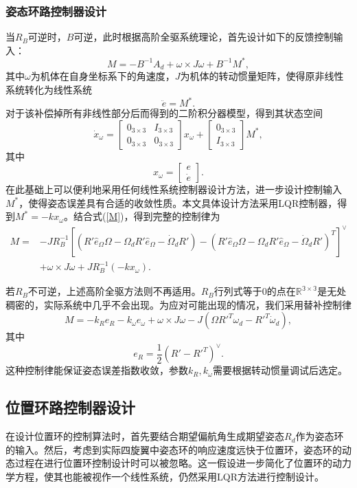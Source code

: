 \subsubsection*{姿态环路控制器设计}
当$R_B$可逆时，$B$可逆，此时根据高阶全驱系统理论\cite{duan1}，首先设计如下的反馈控制输入：\begin{equation}
  M=-B^{-1} A_d+\omega \times J\omega +B^{-1}M^*,
  \label{M}
\end{equation}
其中$\omega$为机体在自身坐标系下的角速度，$J$为机体的转动惯量矩阵，使得原非线性系统转化为线性系统
    $$\ddot e=M^*.$$
对于该补偿掉所有非线性部分后而得到的二阶积分器模型，得到其状态空间
    $$\dot x_\omega=\begin{bmatrix}
        0_{3\times 3} & I_{3\times 3} \\
        0_{3\times 3} & 0_{3\times 3}
    \end{bmatrix} x_\omega+\begin{bmatrix}
        0_{3\times 3} \\ I_{3\times 3}
    \end{bmatrix} M^* ,$$
   其中$$x_\omega=\begin{bmatrix}
        e \\ \dot e
    \end{bmatrix}.$$
在此基础上可以便利地采用任何线性系统控制器设计方法，进一步设计控制输入$M^*$，使得姿态误差具有合适的收敛性质。本文具体设计方法采用LQR控制器，得到$M^*=-kx_\omega$。结合式(\ref{M})，得到完整的控制律为
   $$ \begin{aligned}
        M=&-J R_B^{-1} [(R' \hat e_\Omega \Omega  -\Omega_d R' \hat e_\Omega -\dot \Omega_d R')-(R' \hat e_\Omega \Omega  -\Omega_d R' \hat e_\Omega -\dot \Omega_d R')^T]^\vee \\
         &+\omega \times J\omega + J R_B^{-1}(-kx_\omega).
    \end{aligned}$$

    若$R_B$不可逆，上述高阶全驱方法则不再适用。$R_B$行列式等于$0$的点在$\mathbb{R^{3 \times 3}}$是无处稠密的，实际系统中几乎不会出现。为应对可能出现的情况，我们采用替补控制律\cite{Lee2010}
    $$M=-k_R e_R-k_\omega e_\omega+\omega \times J \omega -J(\Omega R'^T \omega_d-R'^T \dot \omega_d), $$
    其中
    $$ e_R=\frac{1}{2} (R'-R'^T)^\vee.$$
    这种控制律能保证姿态误差指数收敛，参数$k_R,k_\omega$需要根据转动惯量调试后选定。
    \subsection*{位置环路控制器设计}
    在设计位置环的控制算法时，首先要结合期望偏航角生成期望姿态$R_d$作为姿态环的输入。然后，考虑到实际四旋翼中姿态环的响应速度远快于位置环，姿态环的动态过程在进行位置环控制设计时可以被忽略。这一假设进一步简化了位置环的动力学方程，使其也能被视作一个线性系统，仍然采用LQR方法进行控制设计。

